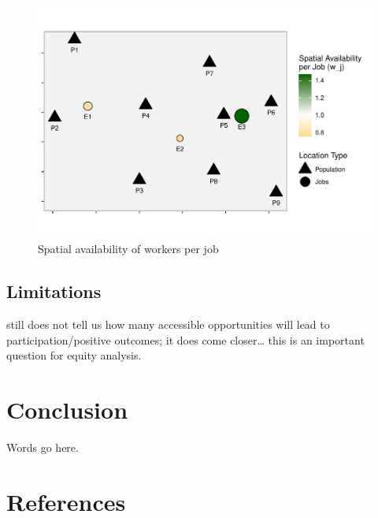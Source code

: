 \documentclass[]{elsarticle} %
\begin{document}
\begin{figure}
\includegraphics[width=1\linewidth]{Spatial-Availability_files/figure-latex/toy-example-availability-workers-per-job-1} \caption{\label{fig:toy-example-availability-workers-per-job}Spatial availability of workers per job}\label{fig:toy-example-availability-workers-per-job}
\end{figure}

\hypertarget{limitations}{%
\subsection{Limitations}\label{limitations}}

still does not tell us how many accessible opportunities will lead to
participation/positive outcomes; it does come closer\ldots{} this is an
important question for equity analysis.

\hypertarget{conclusion}{%
\section{Conclusion}\label{conclusion}}

Words go here.

\hypertarget{references}{%
\section*{References}\label{references}}
\end{document}
